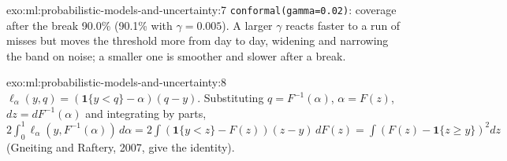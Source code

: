 \begin{solution}{exo:ml:probabilistic-models-and-uncertainty:7}
\texttt{conformal(gamma=0.02)}: coverage after the break 90.0\% (90.1\% with $\gamma = 0.005$). A larger $\gamma$ reacts faster
to a run of misses but moves the threshold more from day to day, widening and narrowing the band on noise; a smaller one
is smoother and slower after a break.
\end{solution}

\begin{solution}{exo:ml:probabilistic-models-and-uncertainty:8}
$\ell_\alpha(y, q) = (\mathbf 1\{y < q\} - \alpha)(q - y)$. Substituting $q = F^{-1}(\alpha)$, $\alpha = F(z)$, $dz =
dF^{-1}(\alpha)$ and integrating by parts, $2\int_0^1\ell_\alpha(y, F^{-1}(\alpha))\,d\alpha = 2\int(\mathbf 1\{y < z\} -
F(z))(z - y)\,dF(z) = \int(F(z) - \mathbf 1\{z\ge y\})^2dz$ (Gneiting and Raftery, 2007, give the identity).
\end{solution}

